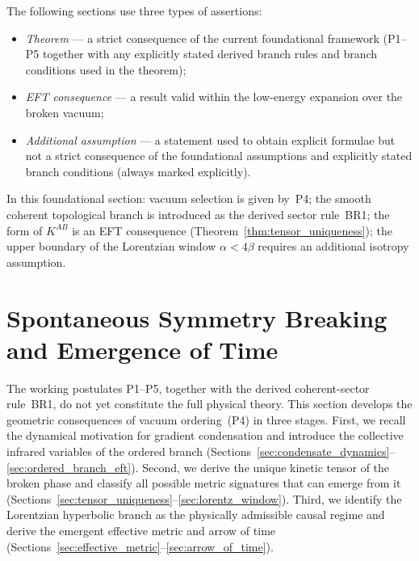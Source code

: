 \documentclass[11pt,a4paper]{article}
\numberwithin{equation}{section}
\begin{document}
The following sections use three types of assertions:
\begin{itemize}
  \item \textit{Theorem} --- a strict consequence of the current
    foundational framework (P1--P5 together with any explicitly stated
    derived branch rules and branch conditions used in the theorem);
  \item \textit{EFT consequence} --- a result valid within the low-energy
    expansion over the broken vacuum;
  \item \textit{Additional assumption} --- a statement used to obtain
    explicit formulae but not a strict consequence of the foundational
    assumptions and explicitly stated branch conditions
    (always marked explicitly).
\end{itemize}
In this foundational section: vacuum selection is given by~P4;
the smooth coherent topological branch is introduced as the derived
sector rule~BR1;
the form of $K^{AB}$ is an EFT consequence
(Theorem~\ref{thm:tensor_uniqueness});
the upper boundary of the Lorentzian window $\alpha<4\beta$
requires an additional isotropy assumption.




\section{Spontaneous Symmetry Breaking and Emergence of Time}
\label{sec:ssb}

The working postulates P1--P5, together with the derived
coherent-sector rule~BR1, do not yet constitute the full physical theory.
This section develops the geometric consequences of vacuum ordering~(P4)
in three stages.
First, we recall the dynamical motivation for gradient condensation
and introduce the collective infrared variables of the ordered branch
(Sections~\ref{sec:condensate_dynamics}--\ref{sec:ordered_branch_eft}).
Second, we derive the unique kinetic tensor of the broken phase and
classify all possible metric signatures that can emerge from it
(Sections~\ref{sec:tensor_uniqueness}--\ref{sec:lorentz_window}).
Third, we identify the Lorentzian hyperbolic branch as the physically
admissible causal regime and derive the emergent effective metric and
arrow of time (Sections~\ref{sec:effective_metric}--\ref{sec:arrow_of_time}).

\end{document}
